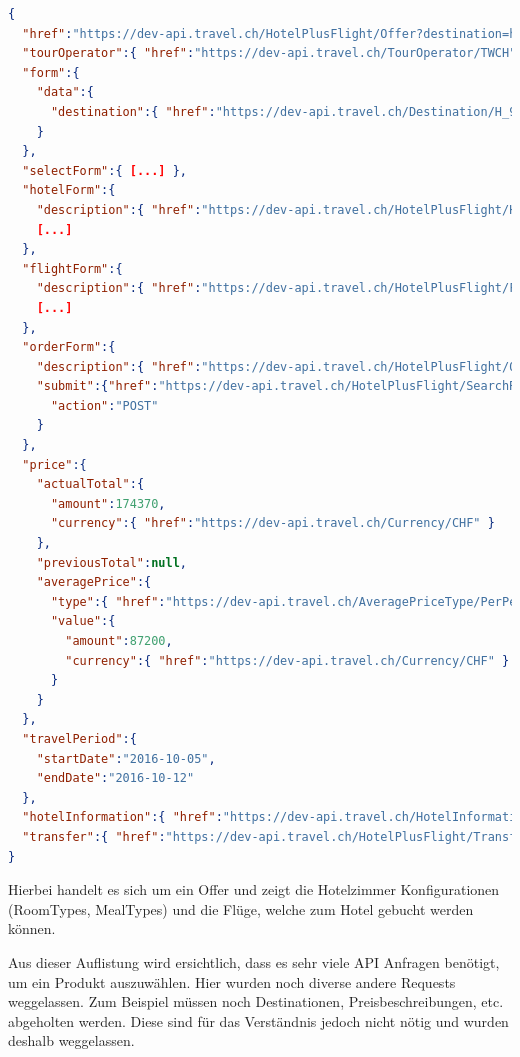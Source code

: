 \begin{lstlisting}[language=json,firstnumber=1]
{
  "href":"https://dev-api.travel.ch/HotelPlusFlight/Offer?destination=https%3A%2F%2Fdev-api.travel.ch%2FDestination%2FH_9675C54E32056B7DC2393EE1D758FEB9&offerHotelInformation=https%3A%2F%2Fdev-api.travel.ch%2FHotelInformation%2F46FFEA61-6A24-4FCB-AE6A-524CE6E752DF[...]",
  "tourOperator":{ "href":"https://dev-api.travel.ch/TourOperator/TWCH" },
  "form":{
    "data":{
      "destination":{ "href":"https://dev-api.travel.ch/Destination/H_9675C54E32056B7DC2393EE1D758FEB9" }
    }
  },
  "selectForm":{ [...] },
  "hotelForm":{
    "description":{ "href":"https://dev-api.travel.ch/HotelPlusFlight/HotelConfigurationFormDescription?offerHotelInformation=https%3A%2F%2Fdev-api.travel.ch%2FHotelInformation%2F46FFEA61-6A24-4FCB-AE6A-524CE6E752DF[...]" },
    [...]
  },
  "flightForm":{
    "description":{ "href":"https://dev-api.travel.ch/HotelPlusFlight/FlightConfigurationFormDescription?offerHotelInformation=https%3A%2F%2Fdev-api.travel.ch%2FHotelInformation%2F46FFEA61-6A24-4FCB-AE6A-524CE6E752DF&roomOccupancies%5B0%5D.dateOfBirths%5B0%5D=null[...]" },
    [...]
  },
  "orderForm":{
    "description":{ "href":"https://dev-api.travel.ch/HotelPlusFlight/OrderFormDescription" },
    "submit":{"href":"https://dev-api.travel.ch/HotelPlusFlight/SearchResult/Offer/Order?destination=https%3A%2F%2Fdev-api.travel.ch%2FDestination%2FH_9675C54E32056B7DC2393EE1D758FEB9&offerHotelInformation=https%3A%2F%2Fdev-api.travel.ch%2FHotelInformation%2F46FFEA61-6A24-4FCB-AE6A-524CE6E752DF[...]",
      "action":"POST"
    }
  },
  "price":{
    "actualTotal":{
      "amount":174370,
      "currency":{ "href":"https://dev-api.travel.ch/Currency/CHF" }
    },
    "previousTotal":null,
    "averagePrice":{
      "type":{ "href":"https://dev-api.travel.ch/AveragePriceType/PerPerson" },
      "value":{
        "amount":87200,
        "currency":{ "href":"https://dev-api.travel.ch/Currency/CHF" }
      }
    }
  },
  "travelPeriod":{
    "startDate":"2016-10-05",
    "endDate":"2016-10-12"
  },
  "hotelInformation":{ "href":"https://dev-api.travel.ch/HotelInformation/46FFEA61-6A24-4FCB-AE6A-524CE6E752DF" },
  "transfer":{ "href":"https://dev-api.travel.ch/HotelPlusFlight/Transfer/NotIncluded" }
}
\end{lstlisting}
Hierbei handelt es sich um ein Offer und zeigt die Hotelzimmer Konfigurationen (RoomTypes, MealTypes) und die Flüge, welche zum Hotel gebucht werden können.

Aus dieser Auflistung wird ersichtlich, dass es sehr viele API Anfragen benötigt, um ein Produkt auszuwählen. Hier wurden noch diverse andere Requests weggelassen. Zum Beispiel müssen noch Destinationen, Preisbeschreibungen, etc. abgeholten werden. Diese sind für das Verständnis jedoch nicht nötig und wurden deshalb weggelassen.


